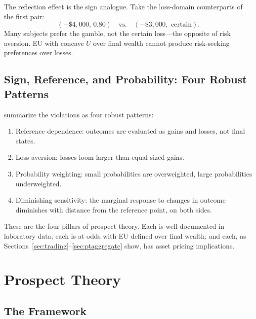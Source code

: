 The reflection effect is the sign analogue. Take the loss-domain counterparts of the first pair:
\[
(-\$4{,}000,\, 0.80) \quad \text{vs.} \quad (-\$3{,}000,\text{ certain}).
\]
Many subjects prefer the gamble, not the certain loss---the opposite of risk aversion. EU with concave $U$ over final wealth cannot produce risk-seeking preferences over losses.

\subsection{Sign, Reference, and Probability: Four Robust Patterns}

\citet{kahneman1979} summarize the violations as four robust patterns:
\begin{enumerate}[label=(\roman*),itemsep=1pt]
  \item Reference dependence: outcomes are evaluated as gains and losses, not final states.
  \item Loss aversion: losses loom larger than equal-sized gains.
  \item Probability weighting: small probabilities are overweighted, large probabilities underweighted.
  \item Diminishing sensitivity: the marginal response to changes in outcome diminishes with distance from the reference point, on both sides.
\end{enumerate}

These are the four pillars of prospect theory. Each is well-documented in laboratory data; each is at odds with EU defined over final wealth; and each, as Sections~\ref{sec:trading}--\ref{sec:ptaggregate} show, has asset pricing implications.

\section{Prospect Theory}
\label{sec:prospect}

\subsection{The Framework}

